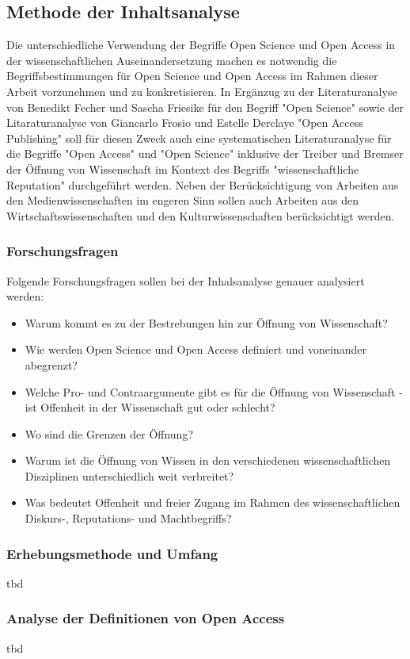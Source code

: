 \subsection{Methode der Inhaltsanalyse}
Die unterschiedliche Verwendung der Begriffe Open Science und Open Access in der wissenschaftlichen Auseinandersetzung machen es notwendig die Begriffsbestimmungen für Open Science und Open Access im Rahmen dieser Arbeit vorzunehmen und zu konkretisieren. In Ergänzug zu der Literaturanalyse von Benedikt Fecher und Sascha Friesike für den Begriff "Open Science"\cite{cite:9} sowie der Litaraturanalyse von Giancarlo Frosio und Estelle Derclaye "Open Access Publishing" \cite{CREATe_2014} soll für diesen Zweck auch eine systematischen Literaturanalyse für die Begriffe "Open Access" und "Open Science" inklusive der Treiber und Bremser der Öffnung von Wissenschaft im Kontext des Begriffs "wissenschaftliche Reputation" durchgeführt werden. Neben der Berücksichtigung von Arbeiten aus den Medienwissenschaften im engeren Sinn sollen auch Arbeiten aus den Wirtschaftswissenschaften und den Kulturwissenschaften berücksichtigt werden.
\subsubsection{Forschungsfragen} 
Folgende Forschungsfragen sollen bei der Inhalsanalyse genauer analysiert werden:
\begin{itemize}
\item Warum kommt es zu der Bestrebungen hin zur Öffnung von Wissenschaft? 
\item Wie werden Open Science und Open Access definiert und voneinander abegrenzt? 
\item Welche Pro- und Contraargumente gibt es für die Öffnung von Wissenschaft - ist Offenheit in der Wissenschaft gut oder schlecht? 
\item Wo sind die Grenzen der Öffnung? 
\item Warum ist die Öffnung von Wissen in den verschiedenen wissenschaftlichen Disziplinen unterschiedlich weit verbreitet? 
\item Was bedeutet Offenheit und freier Zugang im Rahmen des wissenschaftlichen Diskurs-, Reputations- und Machtbegriffs?
\end{itemize}	

\subsubsection{Erhebungsmethode und Umfang} 
tbd

\subsubsection{Analyse der Definitionen von Open Access} 
tbd